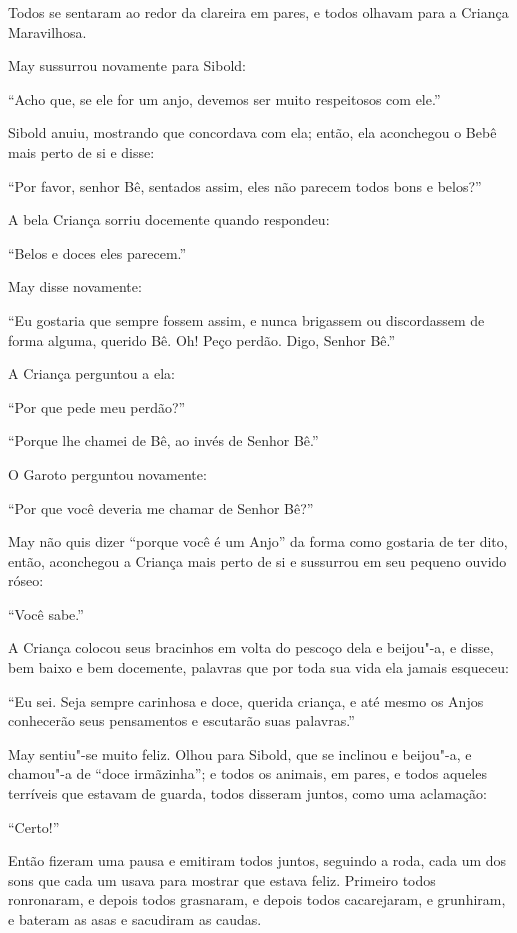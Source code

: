 Todos se sentaram ao redor da clareira em pares, e todos olhavam para a
Criança Maravilhosa.

May sussurrou novamente para Sibold:

``Acho que, se ele for um anjo, devemos ser muito respeitosos com ele.''

Sibold anuiu, mostrando que concordava com ela; então, ela aconchegou o
Bebê mais perto de si e disse:

``Por favor, senhor Bê, sentados assim, eles não parecem todos bons e
belos?''

A bela Criança sorriu docemente quando respondeu:

``Belos e doces eles parecem.''

May disse novamente:

``Eu gostaria que sempre fossem assim, e nunca brigassem ou
discordassem de forma alguma, querido Bê. Oh! Peço perdão. Digo, Senhor
Bê.''

A Criança perguntou a ela:

``Por que pede meu perdão?''

``Porque lhe chamei de Bê, ao invés de Senhor Bê.''

O Garoto perguntou novamente:

``Por que você deveria me chamar de Senhor Bê?''

May não quis dizer ``porque você é um Anjo'' da forma como gostaria de
ter dito, então, aconchegou a Criança mais perto de si e sussurrou
em seu pequeno ouvido róseo:

``Você sabe.''

A Criança colocou seus bracinhos em volta do pescoço dela e beijou"-a, e
disse, bem baixo e bem docemente, palavras que por toda sua vida ela
jamais esqueceu:

``Eu sei. Seja sempre carinhosa e doce, querida criança, e até mesmo os
Anjos conhecerão seus pensamentos e escutarão suas palavras.''

May sentiu"-se muito feliz. Olhou para Sibold, que se inclinou e
beijou"-a, e chamou"-a de ``doce irmãzinha''; e todos os animais, em
pares, e todos aqueles terríveis que estavam de guarda, todos disseram
juntos, como uma aclamação:

``Certo!''

Então fizeram uma pausa e emitiram todos juntos, seguindo a roda, cada
um dos sons que cada um usava para mostrar que estava feliz. Primeiro
todos ronronaram, e depois todos grasnaram, e depois todos cacarejaram,
e grunhiram, e bateram as asas e sacudiram as caudas.

